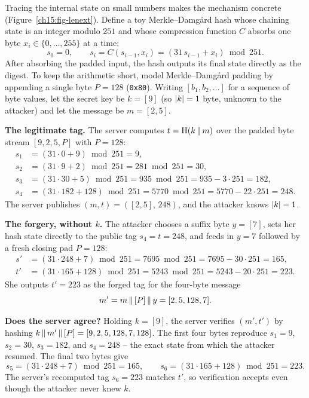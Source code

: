 Tracing the internal state on small numbers makes the mechanism concrete (Figure~\ref{ch15:fig-lenext}). Define a toy Merkle--Damg\aa{}rd hash whose chaining state is an integer modulo $251$ and whose compression function $C$ absorbs one byte $x_i \in \{0,\dots,255\}$ at a time:
\[
  s_0 = 0, \qquad s_i = C(s_{i-1}, x_i) = (31\,s_{i-1} + x_i) \bmod 251.
\]
After absorbing the padded input, the hash outputs its final state directly as the digest. To keep the arithmetic short, model Merkle--Damg\aa{}rd padding by appending a single byte $P = 128$ (\texttt{0x80}). Writing $[b_1, b_2, \dots]$ for a sequence of byte values, let the secret key be $k = [9]$ (so $\lvert k\rvert = 1$ byte, unknown to the attacker) and let the message be $m = [2, 5]$.

\begin{walkbox}
\textbf{The legitimate tag.} The server computes $t=\operatorname{H}(k\,\|\, m)$ over the padded byte stream $[9,2,5,P]$ with $P=128$:
\begin{align*}
  s_1 &= (31\cdot 0 + 9)\bmod 251 = 9, \\
  s_2 &= (31\cdot 9 + 2)\bmod 251 = 281\bmod 251 = 30, \\
  s_3 &= (31\cdot 30 + 5)\bmod 251 = 935\bmod 251 = 935 - 3\cdot 251 = 182, \\
  s_4 &= (31\cdot 182 + 128)\bmod 251 = 5770\bmod 251 = 5770 - 22\cdot 251 = 248.
\end{align*}
The server publishes $(m,t)=([2,5],\,248)$, and the attacker knows $\lvert k\rvert=1$.
\end{walkbox}

\begin{walkbox}
\textbf{The forgery, without $k$.} The attacker chooses a suffix byte $y=[7]$, sets her hash state directly to the public tag $s_4 = t = 248$, and feeds in $y = 7$ followed by a fresh closing pad $P = 128$:
\begin{align*}
  s' &= (31\cdot 248 + 7)\bmod 251 = 7695\bmod 251 = 7695 - 30\cdot 251 = 165, \\
  t' &= (31\cdot 165 + 128)\bmod 251 = 5243\bmod 251 = 5243 - 20\cdot 251 = 223.
\end{align*}
She outputs $t'=223$ as the forged tag for the four-byte message
\[
  m' = m \,\|\, [P] \,\|\, y = [2, 5, 128, 7].
\]
\end{walkbox}

\begin{walkbox}
\textbf{Does the server agree?} Holding $k=[9]$, the server verifies $(m', t')$ by hashing $k \,\|\, m' \,\|\, [P] = [9,2,5,128,7,128]$. The first four bytes reproduce $s_1 = 9$, $s_2 = 30$, $s_3 = 182$, and $s_4 = 248$ -- the exact state from which the attacker resumed. The final two bytes give
\[
  s_5 = (31\cdot 248 + 7)\bmod 251 = 165, \qquad
  s_6 = (31\cdot 165 + 128)\bmod 251 = 223.
\]
The server's recomputed tag $s_6 = 223$ matches $t'$, so verification accepts even though the attacker never knew $k$.
\end{walkbox}

